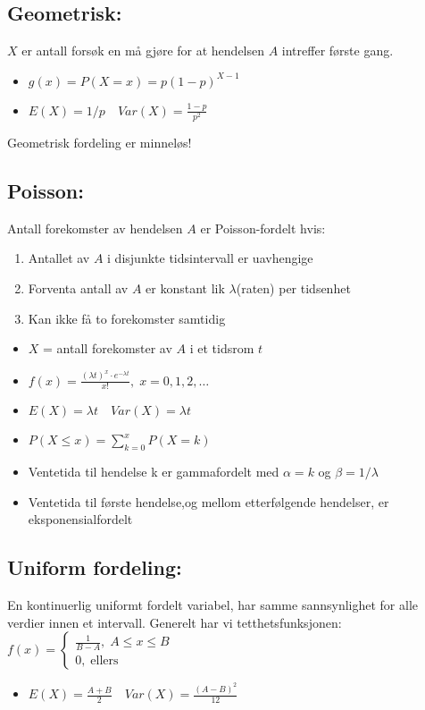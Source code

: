 \documentclass[12pt,a4paper,twocolumn,twoside]{article}
\begin{document}
\subsection*{Geometrisk:}
$X$ er antall forsøk en må gjøre for at hendelsen $A$ intreffer første gang.
\begin{itemize}[topsep=0pt,itemsep=0pt, partopsep=0pt]
    \item $g(x)=P(X=x)=p(1-p)^{X-1}$
    \item $E(X)=1/p \quad Var(X)=\frac{1-p}{p^2}$
\end{itemize}
Geometrisk fordeling er minneløs!
%
%
\subsection*{Poisson:}
Antall forekomster av hendelsen $A$ er Poisson-fordelt hvis:
\begin{enumerate}[topsep=0pt,itemsep=0pt, partopsep=0pt]
    \item Antallet av $A$ i disjunkte tidsintervall er uavhengige
    \item Forventa antall av $A$ er konstant lik $\lambda$(raten) per tidsenhet
    \item Kan ikke få to forekomster samtidig
\end{enumerate}
\begin{itemize}[topsep=0pt,itemsep=0pt, partopsep=0pt]
    \item $X$ = antall forekomster av $A$ i et tidsrom $t$
    \item $f(x) = \frac{(\lambda t)^x\cdot e^{-\lambda t}}{x!},\; x=0,1,2,\dots$
    \item $E(X) = \lambda t \quad Var(X) = \lambda t$
    \item $P(X\leq x)=\sum_{k=0}^x P(X=k)$
    \item Ventetida til hendelse k er gammafordelt med $\alpha =k$ og $\beta=1/\lambda$
    \item Ventetida til første hendelse,og mellom etterfølgende hendelser, er eksponensialfordelt
\end{itemize}
%
%
\subsection*{Uniform fordeling:}
En kontinuerlig uniformt fordelt variabel, har samme sannsynlighet for alle
verdier innen et intervall. Generelt har vi tetthetsfunksjonen:
$f(x)=\begin{cases}
    \frac{1}{B-A},\; A\leq x\leq B\\
    0,\; \text{ellers}
\end{cases}$
\begin{itemize}[topsep=0pt,itemsep=0pt, partopsep=0pt]
    \item $E(X)=\frac{A+B}{2} \quad Var(X)=\frac{(A-B)^2}{12}$
\end{itemize}
%
%
\end{document}
